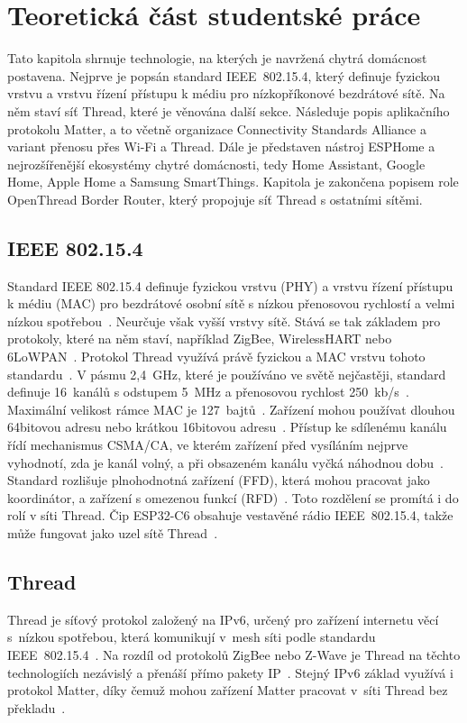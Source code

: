 \chapter{Teoretická část studentské práce}
Tato kapitola shrnuje technologie, na kterých je navržená chytrá domácnost
postavena. Nejprve je popsán standard IEEE~802.15.4, který definuje fyzickou
vrstvu a vrstvu řízení přístupu k médiu pro nízkopříkonové bezdrátové sítě.
Na něm staví síť Thread, které je věnována další sekce. Následuje popis
aplikačního protokolu Matter, a to včetně organizace Connectivity Standards
Alliance a variant přenosu přes Wi-Fi a Thread. Dále je představen nástroj
ESPHome a nejrozšířenější ekosystémy chytré domácnosti, tedy Home Assistant,
Google Home, Apple Home a Samsung SmartThings. Kapitola je zakončena popisem
role OpenThread Border Router, který propojuje síť Thread s ostatními
sítěmi.

\section{IEEE 802.15.4}
Standard IEEE 802.15.4 definuje fyzickou vrstvu (PHY) a vrstvu řízení přístupu k médiu (MAC) pro bezdrátové osobní sítě s nízkou přenosovou rychlostí a velmi nízkou spotřebou~\cite{ieee-802154}. Neurčuje však vyšší vrstvy sítě. Stává se tak základem pro protokoly, které na něm staví, například ZigBee, WirelessHART nebo 6LoWPAN~\cite{mathworks-802154}. Protokol Thread využívá právě fyzickou a MAC vrstvu tohoto standardu~\cite{espressif-openthread}. V pásmu 2,4~GHz, které je používáno ve světě nejčastěji, standard definuje 16~kanálů s odstupem 5~MHz a přenosovou rychlost 250~kb/s~\cite{jain-802154}. Maximální velikost rámce MAC je 127~bajtů~\cite{jain-802154}. Zařízení mohou používat dlouhou 64bitovou adresu nebo krátkou 16bitovou adresu~\cite{nsnam-lrwpan}. Přístup ke sdílenému kanálu řídí mechanismus CSMA/CA, ve kterém zařízení před vysíláním nejprve vyhodnotí, zda je kanál volný, a při obsazeném kanálu vyčká náhodnou dobu~\cite{nxp-an1035}. Standard rozlišuje plnohodnotná zařízení (FFD), která mohou pracovat jako koordinátor, a zařízení s omezenou funkcí (RFD)~\cite{jain-802154}. Toto rozdělení se promítá i do rolí v síti Thread. Čip ESP32-C6 obsahuje vestavěné rádio IEEE~802.15.4, takže může fungovat jako uzel sítě Thread~\cite{espressif-openthread}. 



\section{Thread}
Thread je síťový protokol založený na IPv6, určený pro zařízení internetu věcí
s~nízkou spotřebou, která komunikují v~mesh síti podle standardu
IEEE~802.15.4~\cite{openthread-primer}. Na rozdíl od protokolů ZigBee nebo
Z-Wave je Thread na těchto technologiích nezávislý a přenáší přímo pakety
IP~\cite{openthread-primer}. Stejný IPv6 základ využívá i protokol Matter,
díky čemuž mohou zařízení Matter pracovat v~síti Thread bez
překladu~\cite{thread-group}.

